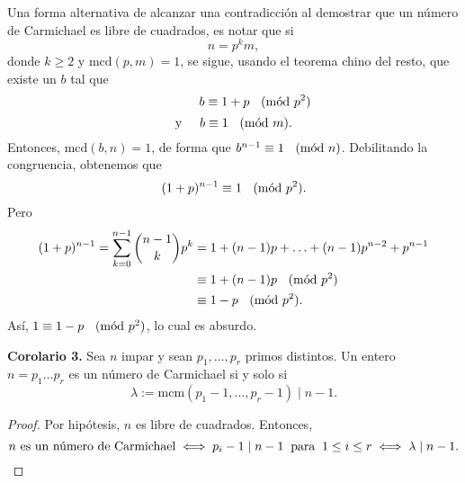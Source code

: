 \documentclass{article}
\theoremstyle{definition}
\newcommand{\Mod}[1]{\ \hspace{0.2cm} (\mathrm{m\acute{o}d}\ #1)}
\begin{document}
Una forma alternativa de alcanzar una contradicción al demostrar que un número de Carmichael es libre de cuadrados, es notar que si 
$$ n = p^{k}m, $$
donde $k \geq 2$ y $\text{mcd}(p, m) = 1$, se sigue, usando el teorema chino del resto, que existe un $b$ tal que
$$\hspace{1.2cm} b \equiv 1+ p \Mod{p^2} $$
$$\text{y} \hspace{0.5cm} b \equiv 1 \Mod{m} .$$
Entonces, $\text{mcd}(b, n) = 1$, de forma que $b^{n-1} \equiv 1 \Mod{n}$. Debilitando la congruencia, obtenemos que
$$ (1 + p)^{n-1} \equiv 1 \Mod{p^2} .$$
Pero
\begin{equation*}
\begin{split}
(1 + p)^{n-1} = \sum_{k=0}^{n-1} \binom{n-1}{k} p^{k} &= 1 + (n-1)p + \ldots + (n-1)p^{n-2} + p^{n-1}  \\
&\equiv 1 + (n-1)p \Mod{p^{2}} \\
&\equiv 1 - p \Mod{p^{2}}.
\end{split}
\end{equation*}
Así, $ 1  \equiv 1 - p \Mod{p^{2}} $, lo cual es absurdo. 
\vspace{0.3cm}
\begin{mybox2}
\textbf{Corolario 3. } Sea $n$ impar y sean $p_{1}, \ldots , p_{r}$ primos distintos. Un entero  \\ $n = p_{1} \ldots p_{r}$ es un número de Carmichael si y solo si $$\lambda := \text{mcm}(p_{1} - 1, \ldots, p_{r} - 1) \mid n - 1 .$$
\end{mybox2}	
\begin{proof}
	Por hipótesis, $n$ es libre de cuadrados. Entonces, 
	$$ \text{$n$ es un número de Carmichael} \iff p_{i} - 1 \mid n - 1 \hspace{0.2cm}\text{para} \hspace{0.2cm} 1 \leq i \leq r \iff \lambda \mid n - 1.$$ 
\end{proof}
\end{document}
